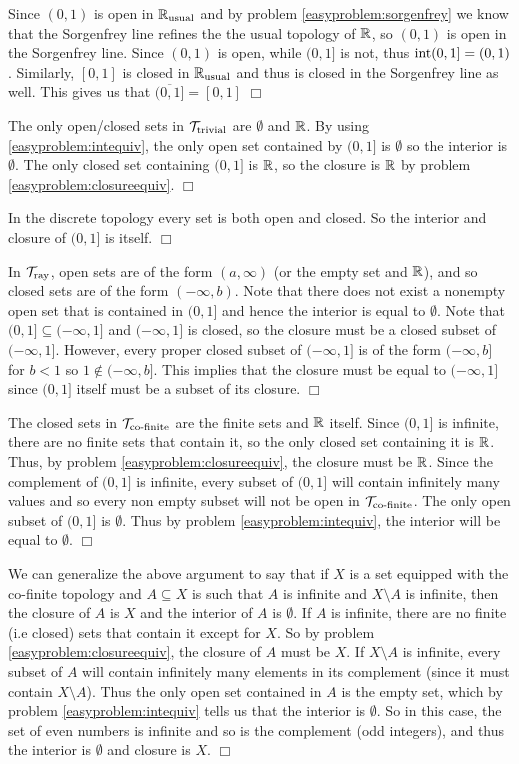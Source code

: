 \documentclass{article}
\begin{document}
{\begin{spacedenumerate}
    Since $(0,1)$ is open in $\mathbb{R}_{\text{usual}}$ and by problem \ref{easyproblem:sorgenfrey} we know that the Sorgenfrey line refines the the usual topology of $\mathbb{R}$, so $(0,1)$ is open in the Sorgenfrey line. Since $(0,1)$ is open, while $(0,1]$ is not, thus $\operatorname{int}(0,1] = (0,1)$. Similarly, $[0,1]$ is closed in $\mathbb{R}_{\text{usual}}$ and thus is closed in the Sorgenfrey line as well. This gives us that $\overline{(0,1]} = [0,1]$ $\Box$ 
    \item The only open/closed sets in $\mathcal{T}_{\text{trivial}}$ are $\emptyset$ and $\mathbb{R}$. By using \ref{easyproblem:intequiv}, the only open set contained by $(0,1]$ is $\emptyset$ so the interior is $\emptyset$. The only closed set containing $(0,1]$ is $\mathbb{R}$, so the closure is $\mathbb{R}$ by problem \ref{easyproblem:closureequiv}. $\Box$
    \item In the discrete topology every set is both open and closed. So the interior and closure of $(0,1]$ is itself. $\Box$
    \item In $\mathcal{T}_{\text{ray}}$, open sets are of the form $(a, \infty)$ (or the empty set and $\mathbb{R}$), and so closed sets are of the form $(-\infty, b)$. Note that there does not exist a nonempty open set that is contained in $(0,1]$ and hence the interior is equal to $\emptyset$. Note that $(0,1]\subseteq (-\infty, 1]$ and $(-\infty, 1]$ is closed, so the closure must be a closed subset of $(-\infty,1]$. However, every proper closed subset of $(-\infty,1]$ is of the form $(-\infty,b]$ for $b <  1$ so $1\not\in(-\infty,b]$. This implies that the closure must be equal to $(-\infty, 1]$ since $(0,1]$ itself must be a subset of its closure. $\Box$
    \item The closed sets in $\mathcal{T}_{\text{co-finite}}$ are the finite sets and $\mathbb{R}$ itself. Since $(0,1]$ is infinite, there are no finite sets that contain it, so the only closed set containing it is $\mathbb{R}$. Thus, by problem \ref{easyproblem:closureequiv}, the closure must be $\mathbb{R}$. Since the complement of $(0,1]$ is infinite, every subset of $(0,1]$ will contain infinitely many values and so every non empty subset will not be open in $\mathcal{T}_{\text{co-finite}}$. The only open subset of $(0,1]$ is $\emptyset$. Thus by problem \ref{easyproblem:intequiv}, the interior will be equal to $\emptyset$. $\Box$
    \item We can generalize the above argument to say that if $X$ is a set equipped with the co-finite topology and $A\subseteq X$ is such that $A$ is infinite and $X\setminus A$ is infinite, then the closure of $A$ is $X$ and the interior of $A$ is $\emptyset$. If $A$ is infinite, there are no finite (i.e closed) sets that contain it except for $X$. So by problem \ref{easyproblem:closureequiv}, the closure of $A$ must be $X$. If $X\setminus A$ is infinite, every subset of $A$ will contain infinitely many elements in its complement (since it must contain $X\setminus A$). Thus the only open set contained in $A$ is the empty set, which by problem \ref{easyproblem:intequiv} tells us that the interior is $\emptyset$. So in this case, the set of even numbers is infinite and so is the complement (odd integers), and thus the interior is $\emptyset$ and closure is $X$. $\Box$

\end{spacedenumerate}}
\end{document}
